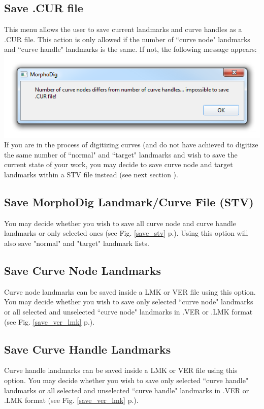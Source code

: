 \subsection{Save .CUR file}
This menu allows the user to save current landmarks and curve handles as a .CUR file. This action is only allowed if the number of ``curve node" landmarks and ``curve handle" landmarks is the same. If not, the following message appears:\\
\includegraphics[scale=0.5]{images/07/curves/nnodes_nhandles_differ.png}
\\
If you are in the process of digitizing curves (and do not have achieved to digitize the same number of ``normal" and ``target"  landmarks and wish to save the current state of your work, you may decide to save curve node and target landmarks within a STV file instead (see next section ).
\subsection{Save MorphoDig Landmark/Curve File (STV)}
You may decide whether you wish to save all curve node and curve handle landmarks or only selected ones (see Fig. \ref{save_stv} p.\pageref{save_stv}). Using this option will also save "normal" and "target" landmark lists.
\subsection{Save Curve Node Landmarks}
Curve node landmarks can be saved inside a LMK or VER file using this option. You may decide whether you wish to save only selected ``curve node" landmarks or all selected and unselected ``curve node" landmarks in .VER or .LMK format (see Fig. \ref{save_ver_lmk} p.\pageref{save_ver_lmk}).

\subsection{Save Curve Handle Landmarks}
Curve handle landmarks can be saved inside a LMK or VER file using this option. You may decide whether you wish to save only selected ``curve handle" landmarks or all selected and unselected ``curve handle" landmarks in .VER or .LMK format (see Fig. \ref{save_ver_lmk} p.\pageref{save_ver_lmk}).


